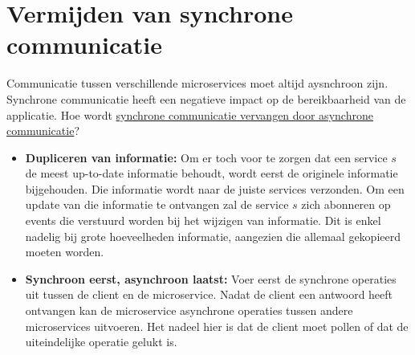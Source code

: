	\section{Vermijden van synchrone communicatie}
	Communicatie tussen verschillende microservices moet altijd aysnchroon zijn. Synchrone communicatie heeft een negatieve impact op de bereikbaarheid van de applicatie. Hoe wordt \uline{synchrone communicatie vervangen door asynchrone communicatie}?
	\begin{itemize}
		\item \textbf{Dupliceren van informatie:} Om er toch voor te zorgen dat een service $s$ de meest up-to-date informatie behoudt, wordt eerst de originele informatie bijgehouden. Die informatie wordt naar de juiste services verzonden. Om een update van die informatie te ontvangen zal de service $s$ zich abonneren op events die verstuurd worden bij het wijzigen van informatie. Dit is enkel nadelig bij grote hoeveelheden informatie, aangezien die allemaal gekopieerd moeten worden.
		\item \textbf{Synchroon eerst, asynchroon laatst:} Voer eerst de synchrone operaties uit tussen de client en de microservice. Nadat de client een antwoord heeft ontvangen kan de microservice asynchrone operaties tussen andere microservices uitvoeren. Het nadeel hier is dat de client moet pollen of dat de uiteindelijke operatie gelukt is. 
	\end{itemize}




